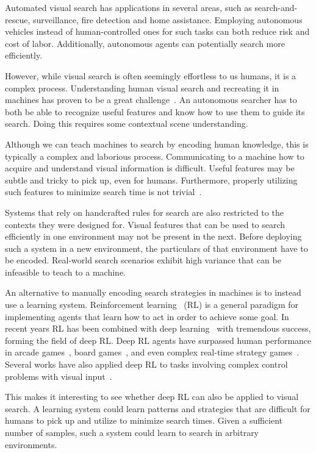 Automated visual search has applications in several areas, such as search-and-rescue, surveillance, fire detection and home assistance.
Employing autonomous vehicles instead of human-controlled ones for such tasks can both reduce risk and cost of labor.
Additionally, autonomous agents can potentially search more efficiently.

However, while visual search is often seemingly effortless to us humans, it is a complex process.
Understanding human visual search and recreating it in machines has proven to be a great challenge~\cite{eckstein_visual_2011}.
An autonomous searcher has to both be able to recognize useful features and know how to use them to guide its search.
Doing this requires some contextual scene understanding.

Although we can teach machines to search by encoding human knowledge, this is typically a complex and laborious process.
Communicating to a machine how to acquire and understand visual information is difficult.
Useful features may be subtle and tricky to pick up, even for humans.
Furthermore, properly utilizing such features to minimize search time is not trivial~\cite{ye_complexity-level_2001,andreopoulos_theory_2009}.

Systems that rely on handcrafted rules for search are also restricted to the contexts they were designed for.
Visual features that can be used to search efficiently in one environment may not be present in the next.
Before deploying such a system in a new environment, the particulars of that environment have to be encoded.
Real-world search scenarios exhibit high variance that can be infeasible to teach to a machine.

An alternative to manually encoding search strategies in machines is to instead use a learning system.
Reinforcement learning~\cite{sutton_reinforcement_2018} (RL) is a general paradigm for implementing agents that learn how to act in order to achieve some goal.
In recent years RL has been combined with deep learning~\cite{goodfellow_deep_2016} with tremendous success, forming the field of deep RL.
Deep RL agents have surpassed human performance in arcade games~\cite{mnih_human-level_2015}, board games~\cite{silver_mastering_2016}, and even complex real-time strategy games~\cite{vinyals_grandmaster_2019}. 
Several works have also applied deep RL to tasks involving complex control problems with visual input~\cite{minut_reinforcement_2001,mnih_recurrent_2014,zhu_target-driven_2017,mirowski_learning_2017}.

This makes it interesting to see whether deep RL can also be applied to visual search.
A learning system could learn patterns and strategies that are difficult for humans to pick up and utilize to minimize search times.
Given a sufficient number of samples, such a system could learn to search in arbitrary environments.

